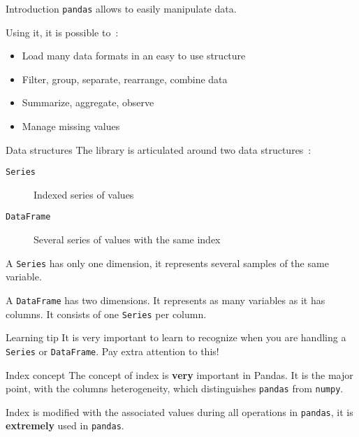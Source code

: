 \begin{frame}{Introduction}
  \texttt{pandas} allows to easily manipulate data.

  Using it, it is possible to~:

  \begin{itemize}
    \item Load many data formats in an easy to use structure
    \item Filter, group, separate, rearrange, combine data
    \item Summarize, aggregate, observe
    \item Manage missing values
  \end{itemize}
\end{frame}

\begin{frame}{Data structures}
  The library is articulated around two data structures~:

  \begin{description}
    \item[\texttt{Series}] Indexed series of values
    \item[\texttt{DataFrame}] Several series of values with the same index
  \end{description}

  A \texttt{Series} has only one dimension, it represents several samples of the same variable.

  A \texttt{DataFrame} has two dimensions. It represents as many variables as it has columns. It consists of one \texttt{Series} per column.

  \begin{alertblock}{Learning tip}
    It is very important to learn to recognize when you are handling a \texttt{Series} or \texttt{DataFrame}. Pay extra attention to this!
  \end{alertblock}
\end{frame}

\begin{frame}{Index concept}
  The concept of index is \textbf{very} important in Pandas. It is the major point, with the columns heterogeneity, which distinguishes \texttt{pandas} from \texttt{numpy}.

  Index is modified with the associated values during all operations in \texttt{pandas}, it is \textbf{extremely} used in \texttt{pandas}.

\end{frame}

